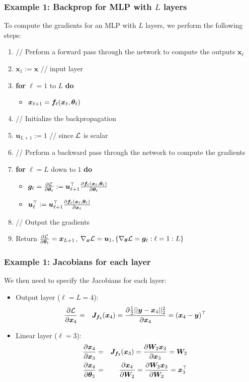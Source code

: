 \documentclass[smaller]{beamer}
\begin{document}
\begin{frame}
  \frametitle{Example 1:  Backprop for MLP with $L$ layers}
\pause To compute the gradients for an MLP with $L$ layers, we perform the following steps:\pause

\begin{enumerate}[<+->]
\item // Perform a forward pass through the network to compute the outputs $\bm x_{\ell}$
\item $\bm x_1 := \bm x$ // input layer
\item \textbf{for} $\ell = 1$ to $L$ \textbf{do}
  \begin{itemize}
  \item $\bm x_{\ell+1} = \bm f_\ell(\bm x_\ell, \bm{\theta}_\ell)$
  \end{itemize}
\item // Initialize the backpropagation
\item $\bm u_{L+1} := 1$ // since $\mathcal L$ is scalar
\item // Perform a backward pass through the network to compute the gradients
\item \textbf{for} $\ell = L$ down to $1$ \textbf{do}
  \begin{itemize}
  \item $ \bm g_\ell = \frac{\partial{\mathcal L}}{\partial{\bm{\theta}_\ell}} := \bm u_{\ell+1}^{\top} \frac{\partial{\bm f_\ell(\bm x_\ell, \bm{\theta}_\ell)}}{\partial{\bm{\theta}_\ell}}$
  \item $\bm u_{\ell}^{\top} := \bm u_{\ell+1}^{\top}\frac{\partial{\bm f_\ell(\bm x_\ell, \bm{\theta}_\ell)}}{\partial{\bm x_{\ell}}}$
  \end{itemize}
  \item // Output the gradients
  \item  Return $\frac{\partial{\mathcal L}}{\partial{\bm{\theta}_\ell}} = \bm x_{L+1}$, $\nabla_{\bm x}\mathcal L = \bm u_1, \{\nabla_{\bm{\theta}}\mathcal L = \bm g_\ell : \ell = 1:L\}$
\end{enumerate}
  

\end{frame}
\begin{frame}
  \frametitle{Example 1: Jacobians for each layer}\pause
We then need to specify the Jacobians for each layer:\pause
\begin{itemize}
\item Output layer ($\ell = L = 4$):
  \begin{eqnarray}
    \frac{\partial{\mathcal L}}{\partial{\bm x_4}} &=& \bm J_{\bm f_4}(\bm x_4) = \frac{\partial{\frac12||\bm y - \bm x_4||_2^2}}{\partial{\bm x_4}} = (\bm x_4 - \bm y)^{\top}
  \end{eqnarray}
  \pause
  \item Linear layer ($\ell = 3$):
    \begin{eqnarray}
    \frac{\partial{\bm x_4}}{\partial{\bm x_3}} &=& \bm J_{\bm f_3}(\bm x_3) = \frac{\partial{\bm W_2 \bm x_3}}{\partial{\bm x_3}} = \bm W_2 \\
    \frac{\partial{\bm x_4}}{\partial{\bm {\theta}_3}} &=& \frac{\partial{\bm x_4}}{\partial{\bm W_2}} = \frac{\partial{\bm W_2 \bm x_3}}{\partial{\bm W_2}} = \bm x_3^{\top}
  \end{eqnarray}
  
\end{itemize} 
\end{frame}
\end{document}
